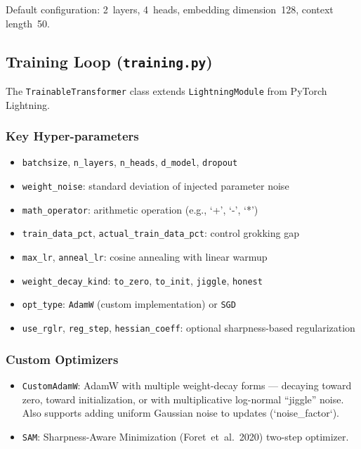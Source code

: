 \documentclass[11pt,a4paper]{article}
\theoremstyle{definition}
\begin{document}
Default configuration: 2~layers, 4~heads, embedding dimension~128, context length~50.

\subsection{Training Loop (\texttt{training.py})}

The \texttt{TrainableTransformer} class extends \texttt{LightningModule} from PyTorch Lightning.

\subsubsection*{Key Hyper-parameters}
\begin{itemize}[leftmargin=*]
    \item \texttt{batchsize}, \texttt{n\_layers}, \texttt{n\_heads}, \texttt{d\_model}, \texttt{dropout}
    \item \texttt{weight\_noise}: standard deviation of injected parameter noise
    \item \texttt{math\_operator}: arithmetic operation (e.g., `+', `-', `*')
    \item \texttt{train\_data\_pct}, \texttt{actual\_train\_data\_pct}: control grokking gap
    \item \texttt{max\_lr}, \texttt{anneal\_lr}: cosine annealing with linear warmup
    \item \texttt{weight\_decay\_kind}: \texttt{to\_zero}, \texttt{to\_init}, \texttt{jiggle}, \texttt{honest}
    \item \texttt{opt\_type}: \texttt{AdamW} (custom implementation) or \texttt{SGD}
    \item \texttt{use\_rglr}, \texttt{reg\_step}, \texttt{hessian\_coeff}: optional sharpness-based regularization
\end{itemize}

\subsubsection*{Custom Optimizers}
\begin{itemize}[leftmargin=*]
    \item \texttt{CustomAdamW}: AdamW with multiple weight-decay forms --- decaying toward zero, toward
          initialization, or with multiplicative log-normal ``jiggle'' noise. Also supports adding
          uniform Gaussian noise to updates (`noise\_factor`).
    \item \texttt{SAM}: Sharpness-Aware Minimization (Foret~et~al.~2020) two-step optimizer.
\end{itemize}
\end{document}
